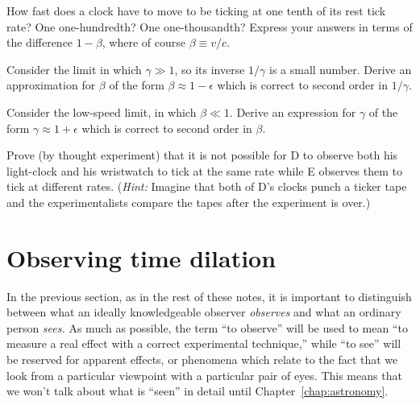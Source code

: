 \begin{problem}
How fast does a clock have to move to be ticking at one tenth of its
rest tick rate?  One one-hundredth?  One one-thousandth?  Express your
answers in terms of the difference $1-\beta$, where of course
$\beta\equiv v/c$.
\end{problem}

\begin{problem}
Consider the limit in which $\gamma\gg 1$, so its inverse $1/\gamma$
is a small number.  Derive an approximation for $\beta$ of the form
$\beta\approx 1-\epsilon$ which is correct to second order in
$1/\gamma$.
\end{problem}

\begin{problem}
Consider the low-speed limit, in which $\beta\ll 1$.  Derive an
expression for $\gamma$ of the form $\gamma\approx 1+\epsilon$ which
is correct to second order in $\beta$.
\end{problem}

\begin{problem}
Prove (by thought experiment) that it is not possible for D to observe
both his light-clock and his wristwatch to tick at the same rate while
E observes them to tick at different rates.  ({\em Hint:\/} Imagine
that both of D's clocks punch a ticker tape and the experimentalists
compare the tapes after the experiment is over.)
\end{problem}


\section{Observing time dilation}
\label{sec:observing}

In the previous section, as in the rest of these notes, it is
important to distinguish between what an ideally knowledgeable
observer {\em observes\/} and what an
ordinary person {\em sees.\/} As much as possible, the term ``to
observe'' will be used to mean ``to measure a real effect with a
correct experimental technique,'' while ``to see'' will be reserved
for apparent effects, or phenomena which relate to the fact that we
look from a particular viewpoint with a particular pair of eyes.  This
means that we won't talk about what is ``seen'' in detail until
Chapter~\ref{chap:astronomy}.

